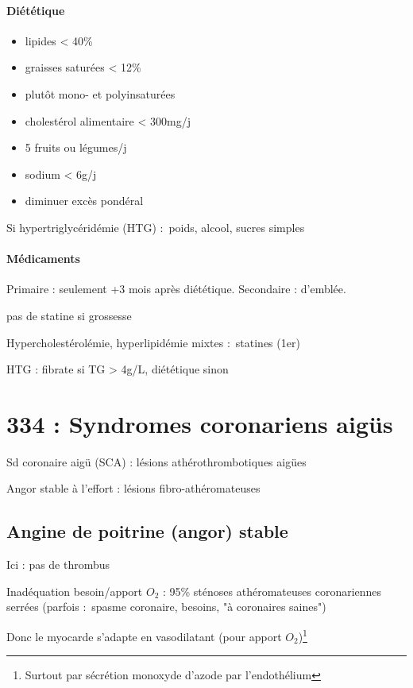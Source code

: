 \documentclass{article}
\begin{document}
\paragraph{Diététique}
\begin{itemize}
  \item lipides < 40\%
  \item graisses saturées < 12\%
  \item plutôt mono- et polyinsaturées
  \item cholestérol alimentaire < 300mg/j
  \item 5 fruits ou légumes/j
  \item sodium < 6g/j
  \item diminuer excès pondéral
\end{itemize}
Si hypertriglycéridémie (HTG) : \dec poids, alcool, sucres simples

\paragraph{Médicaments}
Primaire : seulement +3 mois après diététique. Secondaire : d'emblée.

\danger pas de statine si grossesse

Hypercholestérolémie, hyperlipidémie mixtes : statines (1er)

HTG : fibrate si TG > 4g/L, diététique sinon



\section{334 : Syndromes coronariens aigüs}%
\label{sec:334_syndromes_coronariens_aigus}

Sd coronaire aigü (SCA) : lésions athérothrombotiques aigües

Angor stable à l'effort : lésions fibro-athéromateuses

\subsection{Angine de poitrine (angor) stable}
Ici : pas de thrombus

Inadéquation besoin/apport $O_2$ : 95\% sténoses athéromateuses coronariennes
serrées (parfois : spasme coronaire, \inc besoins, "à coronaires saines")

Donc le myocarde s'adapte en vasodilatant (pour apport $O_2$)\footnote{Surtout par
sécrétion monoxyde d'azode par l'endothélium}
\end{document}
